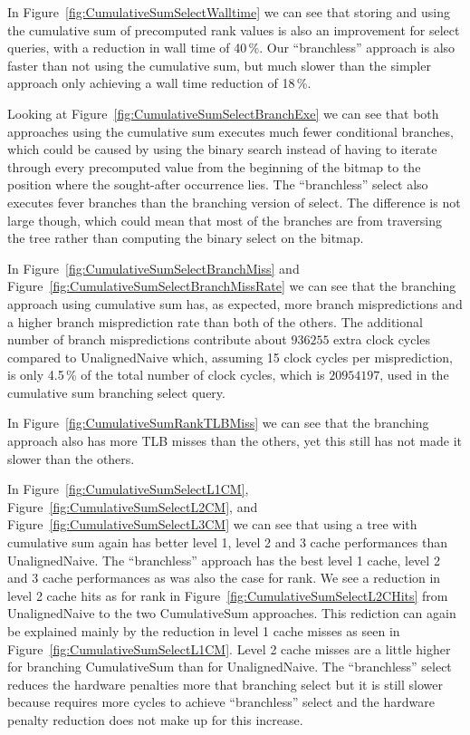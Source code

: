 In Figure~\ref{fig:CumulativeSumSelectWalltime} we can see that storing and using the cumulative sum of precomputed rank values is also an improvement for select queries, with a reduction in wall time of 40\,\%.
Our “branchless” approach is also faster than not using the cumulative sum, but much slower than the simpler approach only achieving a wall time reduction of 18\,\%.

Looking at Figure~\ref{fig:CumulativeSumSelectBranchExe} we can see that both approaches using the cumulative sum executes much fewer conditional branches, which could be caused by using the binary search instead of having to iterate through every precomputed value from the beginning of the bitmap to the position where the sought-after occurrence lies.
The “branchless” select also executes fever branches than the branching version of select.
The difference is not large though, which could mean that most of the branches are from traversing the tree rather than computing the binary select on the bitmap.


In Figure~\ref{fig:CumulativeSumSelectBranchMiss} and Figure~\ref{fig:CumulativeSumSelectBranchMissRate} we can see that the branching approach using cumulative sum has, as expected, more branch mispredictions and a higher branch misprediction rate than both of the others.
The additional number of branch mispredictions contribute about $\num{936255}$ extra clock cycles compared to UnalignedNaive which, assuming 15 clock cycles per misprediction, is only 4.5\,\% of the total number of clock cycles, which is $\num{20954197}$, used in the cumulative sum branching select query.

In Figure~\ref{fig:CumulativeSumRankTLBMiss} we can see that the branching approach also has more TLB misses than the others, yet this still has not made it slower than the others.

In Figure~\ref{fig:CumulativeSumSelectL1CM}, Figure~\ref{fig:CumulativeSumSelectL2CM}, and Figure~\ref{fig:CumulativeSumSelectL3CM} we can see that using a tree with cumulative sum again has better level 1, level 2 and 3 cache performances than UnalignedNaive.
The “branchless” approach has the best level 1 cache, level 2 and 3 cache performances as was also the case for rank.
We see a reduction in level 2 cache hits as for rank in Figure~\ref{fig:CumulativeSumSelectL2CHits} from UnalignedNaive to the two CumulativeSum approaches.
This rediction can again be explained mainly by the reduction in level 1 cache misses as seen in Figure~\ref{fig:CumulativeSumSelectL1CM}.
Level 2 cache misses are a little higher for branching CumulativeSum than for UnalignedNaive.
The “branchless” select reduces the hardware penalties more that branching select but it is still slower because requires more cycles to achieve “branchless” select and the hardware penalty reduction does not make up for this increase. 

